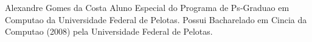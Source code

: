 \documentclass[12pt,a4paper,compsoc]{IEEEtran}
\begin{document}
\begin{IEEEbiography}{Alexandre Gomes da Costa}
Aluno Especial do Programa de Ps-Graduao em Computao da Universidade Federal de Pelotas. Possui Bacharelado em Cincia da Computao (2008) pela Universidade Federal de Pelotas.
\end{IEEEbiography}
\end{document}
